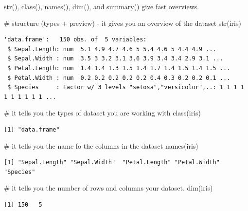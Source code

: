 \documentclass[
  letterpaper,
  DIV=11,
  numbers=noendperiod]{scrreprt}
\newenvironment{Shaded}{\begin{snugshade}}{\end{snugshade}}
\newcommand{\CommentTok}[1]{\textcolor[rgb]{0.37,0.37,0.37}{#1}}
\newcommand{\FunctionTok}[1]{\textcolor[rgb]{0.28,0.35,0.67}{#1}}
\newcommand{\NormalTok}[1]{\textcolor[rgb]{0.00,0.23,0.31}{#1}}
\begin{document}
str(), class(), names(), dim(), and summary() give fast overviews.

\begin{Shaded}
\begin{Highlighting}[]
\CommentTok{\# structure (types + preview) {-} it gives you an overview of the dataset }
\FunctionTok{str}\NormalTok{(iris)  }
\end{Highlighting}
\end{Shaded}

\begin{verbatim}
'data.frame':   150 obs. of  5 variables:
 $ Sepal.Length: num  5.1 4.9 4.7 4.6 5 5.4 4.6 5 4.4 4.9 ...
 $ Sepal.Width : num  3.5 3 3.2 3.1 3.6 3.9 3.4 3.4 2.9 3.1 ...
 $ Petal.Length: num  1.4 1.4 1.3 1.5 1.4 1.7 1.4 1.5 1.4 1.5 ...
 $ Petal.Width : num  0.2 0.2 0.2 0.2 0.2 0.4 0.3 0.2 0.2 0.1 ...
 $ Species     : Factor w/ 3 levels "setosa","versicolor",..: 1 1 1 1 1 1 1 1 1 1 ...
\end{verbatim}

\begin{Shaded}
\begin{Highlighting}[]
\CommentTok{\# it tells you the types of dataset you are working with }
\FunctionTok{class}\NormalTok{(iris)   }
\end{Highlighting}
\end{Shaded}

\begin{verbatim}
[1] "data.frame"
\end{verbatim}

\begin{Shaded}
\begin{Highlighting}[]
\CommentTok{\# it tells you the name fo the columns in the dataset }
\FunctionTok{names}\NormalTok{(iris)  }
\end{Highlighting}
\end{Shaded}

\begin{verbatim}
[1] "Sepal.Length" "Sepal.Width"  "Petal.Length" "Petal.Width"  "Species"     
\end{verbatim}

\begin{Shaded}
\begin{Highlighting}[]
\CommentTok{\# it tells you the number of rows and columns your dataset.  }
\FunctionTok{dim}\NormalTok{(iris)   }
\end{Highlighting}
\end{Shaded}

\begin{verbatim}
[1] 150   5
\end{verbatim}
\end{document}
